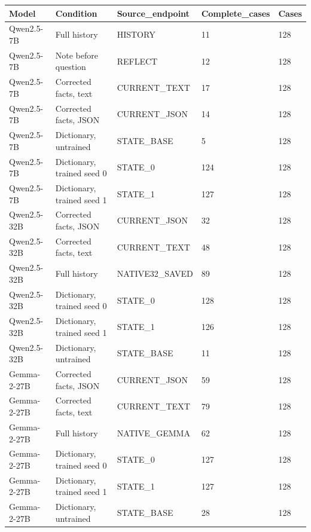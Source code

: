 \begin{tabular}{lllll}
Model & Condition & Source\_endpoint & Complete\_cases & Cases \\
\hline
Qwen2.5-7B & Full history & HISTORY & 11 & 128 \\
Qwen2.5-7B & Note before question & REFLECT & 12 & 128 \\
Qwen2.5-7B & Corrected facts, text & CURRENT\_TEXT & 17 & 128 \\
Qwen2.5-7B & Corrected facts, JSON & CURRENT\_JSON & 14 & 128 \\
Qwen2.5-7B & Dictionary, untrained & STATE\_BASE & 5 & 128 \\
Qwen2.5-7B & Dictionary, trained seed 0 & STATE\_0 & 124 & 128 \\
Qwen2.5-7B & Dictionary, trained seed 1 & STATE\_1 & 127 & 128 \\
Qwen2.5-32B & Corrected facts, JSON & CURRENT\_JSON & 32 & 128 \\
Qwen2.5-32B & Corrected facts, text & CURRENT\_TEXT & 48 & 128 \\
Qwen2.5-32B & Full history & NATIVE32\_SAVED & 89 & 128 \\
Qwen2.5-32B & Dictionary, trained seed 0 & STATE\_0 & 128 & 128 \\
Qwen2.5-32B & Dictionary, trained seed 1 & STATE\_1 & 126 & 128 \\
Qwen2.5-32B & Dictionary, untrained & STATE\_BASE & 11 & 128 \\
Gemma-2-27B & Corrected facts, JSON & CURRENT\_JSON & 59 & 128 \\
Gemma-2-27B & Corrected facts, text & CURRENT\_TEXT & 79 & 128 \\
Gemma-2-27B & Full history & NATIVE\_GEMMA & 62 & 128 \\
Gemma-2-27B & Dictionary, trained seed 0 & STATE\_0 & 127 & 128 \\
Gemma-2-27B & Dictionary, trained seed 1 & STATE\_1 & 127 & 128 \\
Gemma-2-27B & Dictionary, untrained & STATE\_BASE & 28 & 128 \\
\end{tabular}
